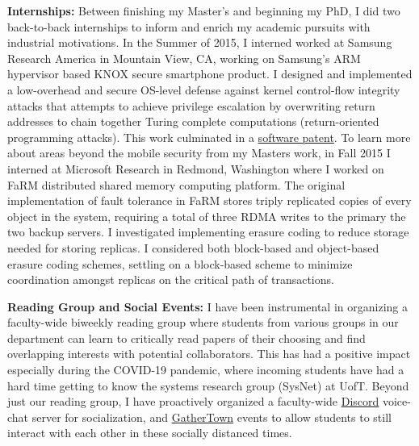 \documentclass[letterpaper,11pt]{article}
\begin{document}
\vspace{1em}
\noindent
\textbf{Internships:} Between finishing my Master's and beginning my PhD, I did two back-to-back internships to inform and enrich my academic pursuits with industrial motivations.
In the Summer of 2015, I interned worked at Samsung Research America in Mountain View, CA, working on Samsung's ARM hypervisor based KNOX secure smartphone product.  
I designed and implemented a low-overhead and secure OS-level defense against kernel control-flow integrity attacks that attempts to achieve privilege escalation by overwriting return addresses to chain together Turing complete 
computations (return-oriented programming attacks).  
This work culminated in a \href{https://patents.google.com/patent/US20170140148A1/en}{software patent}.
To learn more about areas beyond the mobile security from my Masters work, in Fall 2015 I interned at Microsoft Research in Redmond, Washington where I worked on FaRM distributed shared memory computing platform.
The original implementation of fault tolerance in FaRM stores triply replicated copies of every object in the system, requiring a total of three RDMA writes to the primary the two backup servers.
I investigated implementing erasure coding to reduce storage needed for storing replicas.
I considered both block-based and object-based erasure coding schemes, settling on a block-based scheme to minimize coordination amongst replicas on the critical path of transactions.

\vspace{1.0em}
\noindent
\textbf{Reading Group and Social Events:} I have been instrumental in organizing a faculty-wide biweekly reading group where students from various groups in our department can learn to critically read papers of their choosing and find overlapping interests with potential collaborators.
This has had a positive impact especially during the COVID-19 pandemic, where incoming students have had a hard time getting to know the systems research group (SysNet) at UofT.
Beyond just our reading group, I have proactively organized a faculty-wide \href{https://discord.com}{Discord} voice-chat server for socialization, and \href{https://gather.town}{GatherTown} events to allow students to still interact with each other in these socially distanced times.
\end{document}
